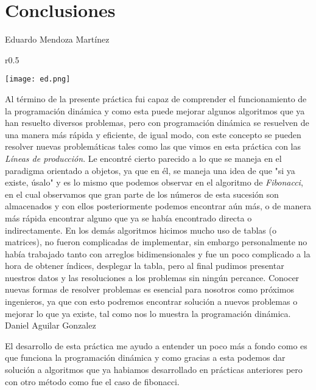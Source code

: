 \documentclass[12pt,twoside]{article}
\begin{document}
\section{Conclusiones}
Eduardo Mendoza Martínez\newline
\begin{wrapfigure}{r}{0.5\textwidth}
  \begin{center}
    \texttt{[image: ed.png]}
  \end{center}

\end{wrapfigure}
Al término de la presente práctica fui capaz de comprender el funcionamiento de la programación dinámica y como esta puede mejorar algunos algoritmos que ya han resuelto diversos problemas, pero con programación dinámica se resuelven de una manera más rápida y eficiente, de igual modo, con este concepto se pueden resolver nuevas problemáticas tales como las que vimos en esta práctica con las \textit{Líneas de producción}. Le encontré cierto parecido a lo que se maneja en el paradigma orientado a objetos, ya que en él, se maneja una idea de que "si ya existe, úsalo" y es lo mismo que podemos observar en el algoritmo de \textit{Fibonacci}, en el cual observamos que gran parte de los números de esta sucesión son almacenados y con ellos posteriormente podemos encontrar aún más, o de manera más rápida encontrar alguno que ya se había encontrado directa o indirectamente. En los demás algoritmos hicimos mucho uso de tablas (o matrices), no fueron complicadas de implementar, sin embargo personalmente no había trabajado tanto con arreglos bidimensionales y fue un poco complicado a la hora de obtener índices, desplegar la tabla, pero al final pudimos presentar nuestros datos y las resoluciones a los problemas sin ningún percance. Conocer nuevas formas de resolver problemas es esencial para nosotros como próximos ingenieros, ya que con esto podremos encontrar solución a nuevos problemas o mejorar lo que ya existe, tal como nos lo muestra la programación dinámica.
\newline \newline \newline \newpage
Daniel Aguilar Gonzalez\newline

El desarrollo de esta práctica me ayudo a entender un poco más a fondo como es que funciona la programación dinámica y como gracias a esta podemos dar solución a algoritmos que ya habiamos desarrollado en prácticas anteriores pero con otro método como fue el caso de fibonacci.
\end{document}
